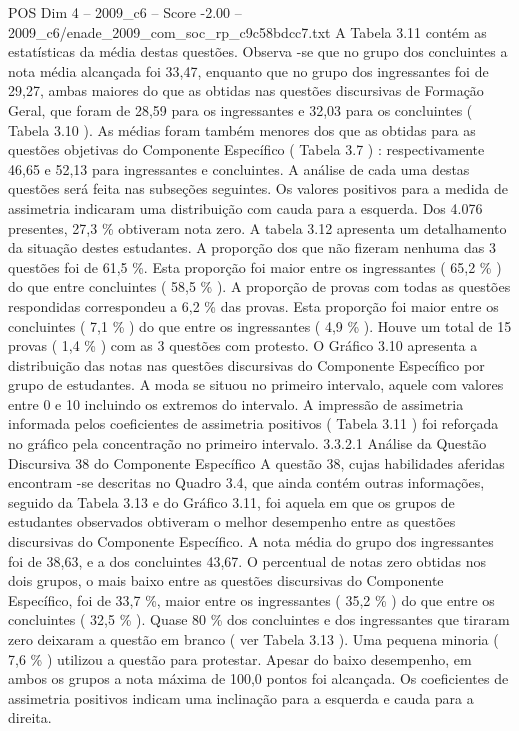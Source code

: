 \begin{textsample}{POS Dim 4 – 2009\_c6 – Score -2.00 – 2009\_c6/enade\_2009\_com\_soc\_rp\_c9c58bdcc7.txt}
A Tabela 3.11 contém as estatísticas da média destas questões.
Observa -se que no grupo dos concluintes a nota média alcançada foi 33,47, enquanto que no grupo dos ingressantes foi de 29,27, ambas maiores do que as obtidas nas questões discursivas de Formação Geral, que foram de 28,59 para os ingressantes e 32,03 para os concluintes ( Tabela 3.10 ).
As médias foram também menores dos que as obtidas para as questões objetivas do Componente Específico ( Tabela 3.7 ) : respectivamente 46,65 e 52,13 para ingressantes e concluintes.
A análise de cada uma destas questões será feita nas subseções seguintes.
Os valores positivos para a medida de assimetria indicaram uma distribuição com cauda para a esquerda.
Dos 4.076 presentes, 27,3 \% obtiveram nota zero.
A tabela 3.12 apresenta um detalhamento da situação destes estudantes.
A proporção dos que não fizeram nenhuma das 3 questões foi de 61,5 \%.
Esta proporção foi maior entre os ingressantes ( 65,2 \% ) do que entre concluintes ( 58,5 \% ).
A proporção de provas com todas as questões respondidas correspondeu a 6,2 \% das provas.
Esta proporção foi maior entre os concluintes ( 7,1 \% ) do que entre os ingressantes ( 4,9 \% ).
Houve um total de 15 provas ( 1,4 \% ) com as 3 questões com protesto.
O Gráfico 3.10 apresenta a distribuição das notas nas questões discursivas do Componente Específico por grupo de estudantes.
A moda se situou no primeiro intervalo, aquele com valores entre 0 e 10 incluindo os extremos do intervalo.
A impressão de assimetria informada pelos coeficientes de assimetria positivos ( Tabela 3.11 ) foi reforçada no gráfico pela concentração no primeiro intervalo. 3.3.2.1 Análise da Questão Discursiva 38 do Componente Específico A questão 38, cujas habilidades aferidas encontram -se descritas no Quadro 3.4, que ainda contém outras informações, seguido da Tabela 3.13 e do Gráfico 3.11, foi aquela em que os grupos de estudantes observados obtiveram o melhor desempenho entre as questões discursivas do Componente Específico.
A nota média do grupo dos ingressantes foi de 38,63, e a dos concluintes 43,67.
O percentual de notas zero obtidas nos dois grupos, o mais baixo entre as questões discursivas do Componente Específico, foi de 33,7 \%, maior entre os ingressantes ( 35,2 \% ) do que entre os concluintes ( 32,5 \% ).
Quase 80 \% dos concluintes e dos ingressantes que tiraram zero deixaram a questão em branco ( ver Tabela 3.13 ).
Uma pequena minoria ( 7,6 \% ) utilizou a questão para protestar.
Apesar do baixo desempenho, em ambos os grupos a nota máxima de 100,0 pontos foi alcançada.
Os coeficientes de assimetria positivos indicam uma inclinação para a esquerda e cauda para a direita.

\end{textsample}
